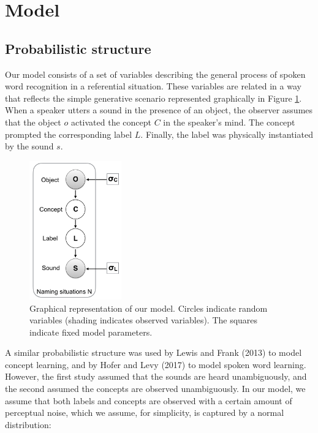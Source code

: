 \documentclass[english,,man]{apa6}
\theoremstyle{definition}
\theoremstyle{definition}
\theoremstyle{definition}
\theoremstyle{remark}
\begin{document}
\section{Model}\label{model}

\subsection{Probabilistic structure}\label{probabilistic-structure}

Our model consists of a set of variables describing the general process
of spoken word recognition in a referential situation. These variables
are related in a way that reflects the simple generative scenario
represented graphically in Figure \ref{fig:model}. When a speaker utters
a sound in the presence of an object, the observer assumes that the
object \(o\) activated the concept \(C\) in the speaker's mind. The
concept prompted the corresponding label \(L\). Finally, the label was
physically instantiated by the sound \(s\).

\begin{figure}

{\centering \includegraphics[width=150px]{figs/model} 

}

\caption{Graphical representation of our model. Circles indicate random variables (shading indicates observed variables). The squares indicate fixed model parameters.}\label{fig:model}
\end{figure}

A similar probabilistic structure was used by Lewis and Frank (2013) to
model concept learning, and by Hofer and Levy (2017) to model spoken
word learning. However, the first study assumed that the sounds are
heard unambiguously, and the second assumed the concepts are observed
unambiguously. In our model, we assume that both labels and concepts are
observed with a certain amount of perceptual noise, which we assume, for
simplicity, is captured by a normal distribution:
\end{document}
